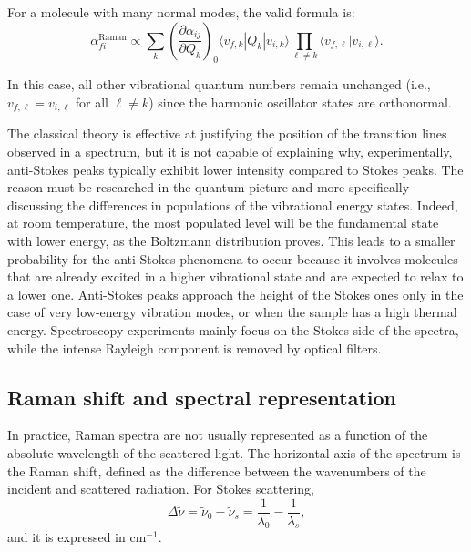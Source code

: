 For a molecule with many normal modes, the valid formula is:
\begin{equation}
    \alpha_{fi}^{\mathrm{Raman}} \propto
    \sum_k
    \left(\frac{\partial \alpha_{ij}}{\partial Q_k}\right)_0
    \langle v_{f,k}|Q_k|v_{i,k}\rangle
    \prod_{\ell\neq k}
    \langle v_{f,\ell}|v_{i,\ell}\rangle .
    \label{eq:raman_matrix_element_multimode}
\end{equation}

In this case, all other vibrational quantum numbers remain unchanged (i.e., \(v_{f,\ell} = v_{i,\ell}\) for all \(\ell \neq k\)) since the harmonic oscillator states are orthonormal. 

The classical theory is effective at justifying the position of the transition lines observed in a spectrum, but it is not capable of explaining why, experimentally, anti-Stokes peaks typically exhibit lower intensity compared to Stokes peaks. The reason must be researched in the quantum picture and more specifically discussing the differences in populations of the vibrational energy states. Indeed, at room temperature, the most populated level will be the fundamental state with lower energy, as the Boltzmann distribution proves. This leads to a smaller probability for the anti-Stokes phenomena to occur because it involves molecules that are already excited in a higher vibrational state and are expected to relax to a lower one.
Anti-Stokes peaks approach the height of the Stokes ones only in the case of very low-energy vibration modes, or
when the sample has a high thermal energy. Spectroscopy experiments mainly focus on the Stokes side of the spectra, while the intense Rayleigh component is removed by optical filters.

\subsection{Raman shift and spectral representation}
\label{subsec:raman_shifts}

In practice, Raman spectra are not usually represented as a function of the absolute wavelength of the scattered light. The horizontal axis of the spectrum is the Raman shift, defined as the difference between the wavenumbers of the incident and scattered radiation. For Stokes scattering,
\begin{equation}
    \Delta \tilde{\nu} =
    \tilde{\nu}_0 - \tilde{\nu}_s =
    \frac{1}{\lambda_0} - \frac{1}{\lambda_s},
    \label{eq:raman_shift}
\end{equation}
and it is expressed in \(\mathrm{cm}^{-1}\). 

